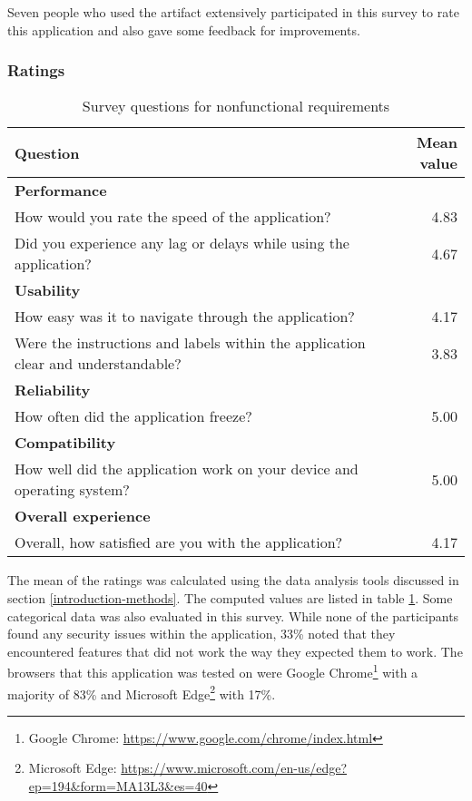Seven people who used the artifact extensively participated in this survey to rate this application and also gave some feedback for improvements.

\subsubsection{Ratings}

\begin{table}[!h]
    \centering
    \begin{tabular}{p{8cm} r}
    \hline
        \textbf{Question} & \textbf{Mean value} \\ 
     \hline
        \textbf{Performance} & \\
        How would you rate the speed of the application? & 4.83 \\
        Did you experience any lag or delays while using the application? & 4.67 \\
     \hline
        \textbf{Usability} & \\
        How easy was it to navigate through the application? & 4.17\\
        Were the instructions and labels within the application clear and understandable? & 3.83 \\
     \hline
        \textbf{Reliability} & \\
        How often did the application freeze? & 5.00 \\
     \hline
        \textbf{Compatibility} & \\
        How well did the application work on your device and operating system? & 5.00 \\
     \hline
        \textbf{Overall experience} & \\
        Overall, how satisfied are you with the application? & 4.17 \\
        
    \end{tabular}
    \caption{Survey questions for nonfunctional requirements}
    \label{tab:tool-ratings}
\end{table}

The mean of the ratings was calculated using the data analysis
tools discussed in section \ref{introduction-methods}.
The computed values are listed in table \ref{tab:tool-ratings}.
Some categorical data was also evaluated in this survey. 
While none of the participants found any security issues within the application, 
33\% noted that they encountered features that did not work the way they expected them to work.
The browsers that this application was tested on were Google Chrome\footnote{Google Chrome: \url{https://www.google.com/chrome/index.html}} with a majority of 83\% and Microsoft Edge\footnote{Microsoft Edge: \url{https://www.microsoft.com/en-us/edge?ep=194&form=MA13L3&es=40}} with 17\%. 

